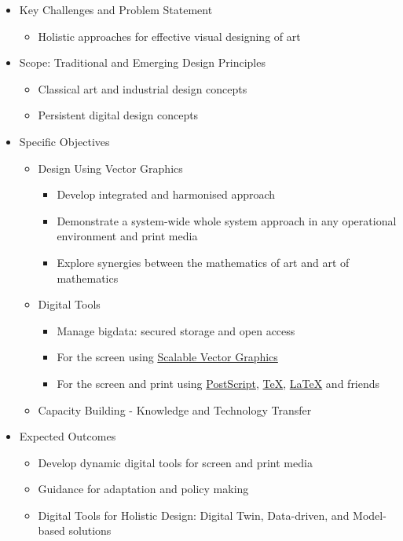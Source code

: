 \documentclass{ammTalk}
\begin{document}
\begin{itemize}[itemsep=4mm]\LARGE
\item Key Challenges and Problem Statement
\begin{itemize}[before=\large]
\item Holistic approaches for effective visual designing of art
\end{itemize}

\item Scope: Traditional and Emerging Design Principles
\begin{itemize}[before=\large]
\item Classical art and industrial design concepts
\item Persistent digital design concepts
\end{itemize}
\item Specific Objectives
\begin{itemize}[before=\Large]
\item Design Using Vector Graphics
\begin{itemize}[nosep,before=\normalfont\large]
\item Develop integrated and harmonised approach
\item Demonstrate a system-wide whole system approach in any operational environment and print media
\item Explore synergies between the mathematics of art and art of mathematics
\end{itemize}
\item Digital Tools
\begin{itemize}[nosep,before=\normalfont\large]
\item Manage bigdata: secured storage and open access
\item For the screen using \href{https://en.wikipedia.org/wiki/SVG}{Scalable Vector Graphics}
\item For the screen and print using \href{https://en.wikipedia.org/wiki/PostScript}{PostScript}, \href{https://en.wikipedia.org/wiki/TeX}{\TeX}, \href{https://en.wikipedia.org/wiki/LaTeX}{\LaTeX} and friends
\end{itemize}
\item Capacity Building - Knowledge and Technology Transfer
\end{itemize}
\item Expected Outcomes
\begin{itemize}[before=\large]
\item Develop dynamic digital tools for screen and print media
\item Guidance for adaptation and policy making
\item Digital Tools for Holistic Design: Digital Twin, Data-driven, and Model-based solutions
\end{itemize}
\end{itemize}
\end{document}
